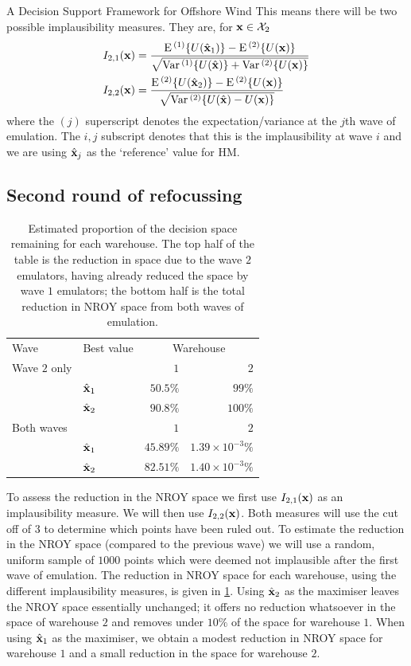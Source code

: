 \begin{chapter}{A Decision Support Framework for Offshore Wind \label{Ch:ds-for-ow}}
This means there will be two possible implausibility measures. They are, for $\mathbf{x} \in \mathcal{X}_2$
\begin{align}
 I_{2,1}(\mathbf{x}) &= \frac{\textrm{E}\,^{(1)}\{U(\hat{\mathbf{x}}_1)\} - \textrm{E}\,^{(2)} \{U(\mathbf{x})\} }{\sqrt{\mathrm{Var}\,^{(1)} \{U(\hat{\mathbf{x}}) \} + \mathrm{Var}\,^{(2)}\{U(\mathbf{x})\} }}\\
 I_{2,2}(\mathbf{x}) &= \frac{\textrm{E}\,^{(2)}\{U(\hat{\mathbf{x}}_2)\} - \textrm{E}\,^{(2)} \{U(\mathbf{x})\} }{\sqrt{\mathrm{Var}\,^{(2)} \{U(\hat{\mathbf{x}}) - U(\mathbf{x})\} }}
\end{align}
where the $(j)$ superscript denotes the expectation/variance at the $j$th wave of emulation. The $i,j$ subscript denotes that this is the implausibility at wave $i$ and we are using $\hat{\mathbf{x}}_j$ as the `reference' value for HM.

\subsection{Second round of refocussing}
\begin{table}
	\centering
	\begin{tabular}{llrr}
		\toprule
  Wave & Best value & \multicolumn{2}{c}{Warehouse} \\\cmidrule{1-4}
  Wave $2$ only& & $1$ & $2$ \\
  &$\hat{\mathbf{x}}_1$ & $50.5\%$ & $99\%$ \\
  &$\hat{\mathbf{x}}_2$ & $90.8\%$ & $100\%$\\\cmidrule{1-4}
  Both waves& & $1$ & $2$ \\
  &$\hat{\mathbf{x}}_1$ & $45.89\%$ & $1.39\times10^{-3}\%$ \\
  &$\hat{\mathbf{x}}_2$ & $82.51\%$ & $1.40\times10^{-3}\%$ \\\bottomrule
	\end{tabular}
	\caption{Estimated proportion of the decision space remaining for each warehouse. The top half of the table is the reduction in space due to the wave $2$ emulators, having already reduced the space by wave $1$ emulators; the bottom half is the total reduction in NROY space from both waves of emulation. \label{Tab:compare-nroy}}
\end{table}
To assess the reduction in the NROY space we first use $I_{2,1}(\mathbf{x})$ as an implausibility measure. We will then use $I_{2,2}(\mathbf{x})$. Both measures will use the cut off of $3$ to determine which points have been ruled out. To estimate the reduction in the NROY space (compared to the previous wave) we will use a random, uniform sample of $1000$ points which were deemed not implausible after the first wave of emulation. The reduction in NROY space for each warehouse, using the different implausibility measures, is given in \cref{Tab:compare-nroy}. Using $\hat{\mathbf{x}}_2$ as the maximiser leaves the NROY space essentially unchanged; it offers no reduction whatsoever in the space of warehouse $2$ and removes under $10\%$ of the space for warehouse $1$. When using $\hat{\mathbf{x}}_1$ as the maximiser, we obtain a modest reduction in NROY space for warehouse $1$ and a small reduction in the space for warehouse $2$.


\end{chapter}
